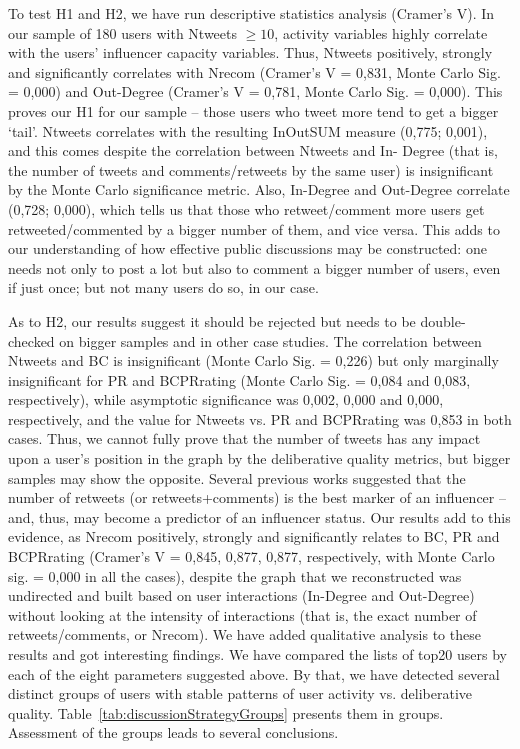 To test H1 and H2, we have run descriptive statistics analysis (Cramer's V). In our sample of 180 users with Ntweets \(\ge 10\), activity variables highly correlate with the users’ influencer capacity variables. Thus, Ntweets positively, strongly and significantly correlates with Nrecom (Cramer’s V = 0,831, Monte Carlo Sig. = 0,000) and Out-Degree (Cramer’s V = 0,781, Monte Carlo Sig. = 0,000). This proves our H1 for our sample – those users who tweet more tend to get a bigger ‘tail’. Ntweets correlates with the resulting InOutSUM measure (0,775; 0,001), and this comes despite the correlation between Ntweets and In- Degree (that is, the number of tweets and comments/retweets by the same user) is insignificant by the Monte Carlo significance metric. Also, In-Degree and Out-Degree correlate (0,728; 0,000), which tells us that those who retweet/comment more users get retweeted/commented by a bigger number of them, and vice versa. This adds to our understanding of how effective public discussions may be constructed: one needs not only to post a lot but also to comment a bigger number of users, even if just once; but not many users do so, in our case.

As to H2, our results suggest it should be rejected but needs to be double-checked on bigger samples and in other case studies. The correlation between Ntweets and BC is insignificant (Monte Carlo Sig. = 0,226) but only marginally insignificant for PR and BCPRrating (Monte Carlo Sig. = 0,084 and 0,083, respectively), while asymptotic significance was 0,002, 0,000 and 0,000, respectively, and the value for Ntweets vs. PR and BCPRrating was 0,853 in both cases. Thus, we cannot fully prove that the number of tweets has any impact upon a user’s position in the graph by the deliberative quality metrics, but bigger samples may show the opposite.
Several previous works suggested that the number of retweets (or retweets+comments) is the best marker of an influencer – and, thus, may become a predictor of an influencer status. Our results add to this evidence, as Nrecom positively, strongly and significantly relates to BC, PR and BCPRrating (Cramer’s V = 0,845, 0,877, 0,877, respectively, with Monte Carlo sig. = 0,000 in all the cases), despite the graph that we reconstructed was undirected and built based on user interactions (In-Degree and Out-Degree) without looking at the intensity of interactions (that is, the exact number of retweets/comments, or Nrecom).
We have added qualitative analysis to these results and got interesting findings. We have compared the lists of top20 users by each of the eight parameters suggested above. By that, we have detected several distinct groups of users with stable patterns of user activity vs. deliberative quality. Table~\cref{tab:discussionStrategyGroups} presents them in groups. Assessment of the groups leads to several conclusions.


